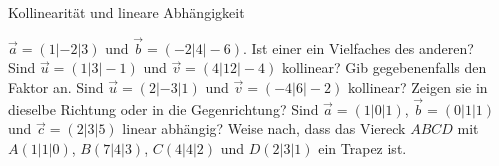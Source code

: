 \setcounter{aufgabe}{6}

\begin{aufgabe}{Kollinearität und lineare Abhängigkeit}
\begin{teile}
\teil $\vec{a} = (1 | -2 | 3)$ und $\vec{b} = (-2 | 4 | -6)$. Ist einer ein Vielfaches des anderen? \\  
\teil Sind $\vec{u} = (1 | 3 | -1)$ und $\vec{v} = (4 | 12 | -4)$ kollinear? Gib gegebenenfalls den Faktor an.
\teil Sind $\vec{u} = (2 | -3 | 1)$ und $\vec{v} = (-4 | 6 | -2)$ kollinear? Zeigen sie in dieselbe Richtung oder in die Gegenrichtung?
\teil Sind $\vec{a} = (1 | 0 | 1)$, $\vec{b} = (0 | 1 | 1)$ und $\vec{c} = (2 | 3 | 5)$ linear abhängig?
\teil Weise nach, dass das Viereck $ABCD$ mit $A(1 | 1 | 0)$, $B(7 | 4 | 3)$, $C(4 | 4 | 2)$ und $D(2 | 3 | 1)$ ein Trapez ist.
\end{teile}
\end{aufgabe}
